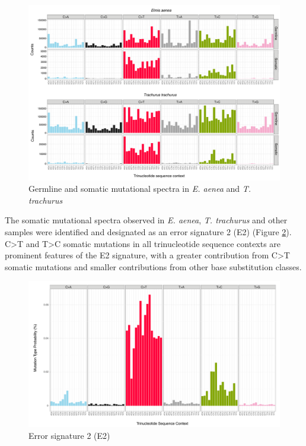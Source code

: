 \begin{figure}[h!]
\caption{Germline and somatic mutational spectra in \textit{E. aenea} and \textit{T. trachurus}}
\label{figure:icElmAene2-fTraTra1}
\begin{centering}
\includegraphics[width=\textwidth]{Vector/icElmAene2_fTraTra1.germline_somatic_sbs96.pdf}
\end{centering}
\end{figure}

The somatic mutational spectra observed in \textit{E. aenea}, \textit{T. trachurus} and other samples were identified and designated as an error signature 2 (E2) (Figure \ref{figure:E2}). C>T and T>C somatic mutations in all trinucleotide sequence contexts are prominent features of the E2 signature, with a greater contribution from C>T somatic mutations and smaller contributions from other base substitution classes. 

\begin{figure}[htbp!]
\caption{Error signature 2 (E2)}
\label{figure:E2}
\begin{centering}
\includegraphics[width=\textwidth]{Vector/E2_signature.pdf}
\end{centering}
\end{figure}

